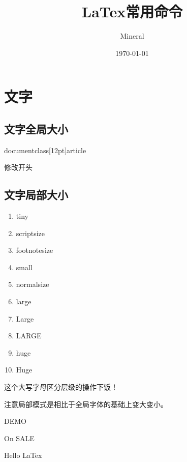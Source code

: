 \documentclass[utf8]{ctexart}
\author{Mineral}
\title{LaTex常用命令}
\date {\today}
\begin{document}
		\maketitle
	    \section{文字}
	    \subsection{文字全局大小}
	    \par documentclass[12pt]{article}	
		\par 修改开头
		\subsection{文字局部大小}
		\begin{enumerate}
				\item tiny
				\item scriptsize
				\item footnotesize
				\item small
				\item normalsize
				\item large
				\item Large
				\item LARGE
				\item huge
				\item Huge									
		\end{enumerate}
		\par 这个大写字母区分层级的操作下饭！
		\par 注意局部模式是相比于全局字体的基础上变大变小。
	    \par \LARGE DEMO
	    \par \Large On SALE	
	    \par \huge Hello LaTex
	    

		
\end{document}
